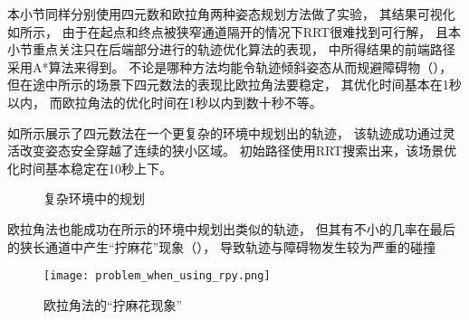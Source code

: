 本小节同样分别使用四元数和欧拉角两种姿态规划方法做了实验，
其结果可视化如所示，
由于在起点和终点被狭窄通道隔开的情况下RRT很难找到可行解，
且本小节重点关注只在后端部分进行的轨迹优化算法的表现，
中所得结果的前端路径采用A*算法来得到。
不论是哪种方法均能令轨迹倾斜姿态从而规避障碍物（），
但在途中所示的场景下四元数法的表现比欧拉角法要稳定，
其优化时间基本在1秒以内，
而欧拉角法的优化时间在1秒以内到数十秒不等。


如所示展示了四元数法在一个更复杂的环境中规划出的轨迹，
该轨迹成功通过灵活改变姿态安全穿越了连续的狭小区域。
初始路径使用RRT搜索出来，该场景优化时间基本稳定在10秒上下。

\begin{figure}[!ht]
    \setlength{\subfigcapskip}{-1bp}
    \centering
    \begin{minipage}{\textwidth}
  
    \centering
    \subfigure{\label{fig:complex_env_and_traj_overview}}\addtocounter{subfigure}{-2}
    \hspace{0.2em}
    \subfigure{\label{fig:complex_env_and_traj_detail_1}}\addtocounter{subfigure}{-2}
    \hspace{0.2em}
    \subfigure{\label{fig:complex_env_and_traj_detail_2}}\addtocounter{subfigure}{-2}
    
    \end{minipage}
    \caption{复杂环境中的规划}
    \label{fig:planning_in_complex_env}
  \end{figure}

欧拉角法也能成功在所示的环境中规划出类似的轨迹，
但其有不小的几率在最后的狭长通道中产生“拧麻花”现象（），
导致轨迹与障碍物发生较为严重的碰撞

\begin{figure}[ht]
    \centering
    \texttt{[image: problem\_when\_using\_rpy.png]}
    \caption{欧拉角法的“拧麻花现象”}
    \label{fig:problem_when_using_rpy}
\end{figure}

